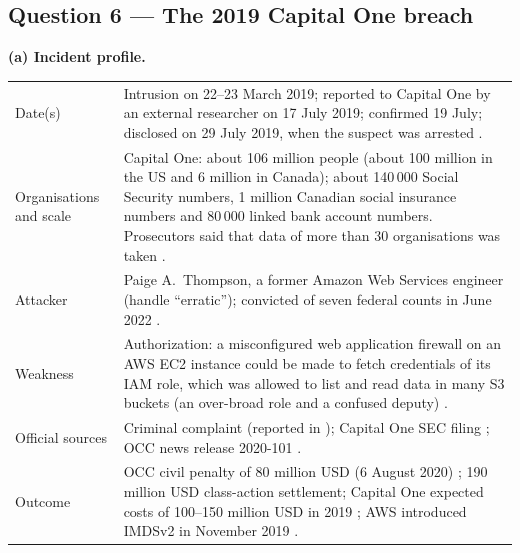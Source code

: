 \documentclass[11pt,a4paper]{article}
\begin{document}
\subsection*{Question 6 --- The 2019 Capital One breach}
\textbf{(a) Incident profile.}
\begin{table}[H]
\centering\small
\begin{tabularx}{\textwidth}{@{}P{3.6cm}L@{}}
\toprule
Date(s) & Intrusion on 22--23 March 2019; reported to Capital One by an external researcher on 17 July 2019; confirmed 19 July; disclosed on 29 July 2019, when the suspect was arrested \cite{cap1sec,fbicharge}. \\
Organisations and scale & Capital One: about 106 million people (about 100 million in the US and 6 million in Canada); about 140\,000 Social Security numbers, 1 million Canadian social insurance numbers and 80\,000 linked bank account numbers. Prosecutors said that data of more than 30 organisations was taken \cite{cap1sec,conviction}. \\
Attacker & Paige A.\ Thompson, a former Amazon Web Services engineer (handle ``erratic''); convicted of seven federal counts in June 2022 \cite{conviction}. \\
Weakness & Authorization: a misconfigured web application firewall on an AWS EC2 instance could be made to fetch credentials of its IAM role, which was allowed to list and read data in many S3 buckets (an over-broad role and a confused deputy) \cite{fbicharge,ssrf}. \\
Official sources & Criminal complaint (reported in \cite{fbicharge}); Capital One SEC filing \cite{cap1sec}; OCC news release 2020-101 \cite{occ}. \\
Outcome & OCC civil penalty of 80 million USD (6 August 2020) \cite{occ}; 190 million USD class-action settlement; Capital One expected costs of 100--150 million USD in 2019 \cite{cap1sec,conviction}; AWS introduced IMDSv2 in November 2019 \cite{imds}. \\
\bottomrule
\end{tabularx}
\end{table}
\end{document}

